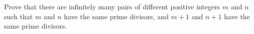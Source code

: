 Prove that there are infinitely many pairs of different positive integers $m$ and $n$ such that $m$ and $n$ have the same prime divisors, and $m+1$ and $n+1$ have the same prime divisors.
